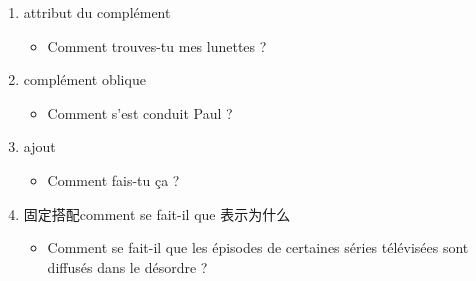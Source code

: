 \documentclass[UTF8]{report}
\begin{document}
\begin{enumerate}
\begin{enumerate}
        \item attribut du complément
        \begin{itemize}
            \item Comment trouves-tu mes lunettes ?
        \end{itemize}
        \item complément oblique
        \begin{itemize}
            \item Comment s’est conduit Paul ?
        \end{itemize}
        \item ajout
        \begin{itemize}
            \item Comment fais-tu ça ?
        \end{itemize}
        \item 固定搭配comment se fait-il que 表示为什么
        \begin{itemize}
            \item Comment se fait-il que les épisodes de certaines séries télévisées sont diffusés dans le désordre ?
        \end{itemize}
    \end{enumerate}
\end{enumerate}
\end{document}
